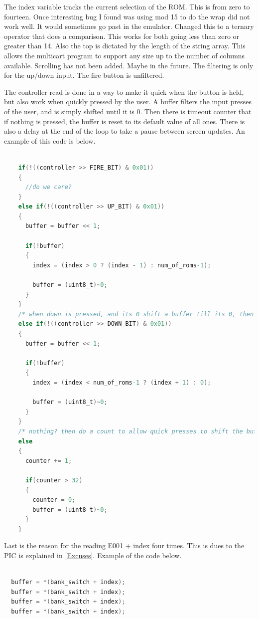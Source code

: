 \documentclass{article}
\begin{document}
  \par
  The index variable tracks the current selection of the ROM. This is from zero to fourteen. Once interesting bug I found was using mod 15 to do the wrap did
  not work well. It would sometimes go past in the emulator. Changed this to a ternary operator that does a comparison. This works for both going
  less than zero or greater than 14. Also the top is dictated by the length of the string array. This allows the multicart program to support any size up to
  the number of columns available. Scrolling has not been added. Maybe in the future. The filtering is only for the up/down input. The fire button is
  unfiltered.
  \par
  The controller read is done in a way to make it quick when the button is held, but also work when quickly pressed by the user. A buffer filters the input
  presses of the user, and is simply shifted until it is 0. Then there is timeout counter that if nothing is pressed, the buffer is reset to its default value
  of all ones. There is also a delay at the end of the loop to take a pause between screen updates. An example of this code is below.

  \begin{lstlisting}[language=C]

    if(!((controller >> FIRE_BIT) & 0x01))
    {
      //do we care?
    }
    else if(!((controller >> UP_BIT) & 0x01))
    {
      buffer = buffer << 1;

      if(!buffer)
      {
        index = (index > 0 ? (index - 1) : num_of_roms-1);

        buffer = (uint8_t)~0;
      }
    }
    /* when down is pressed, and its 0 shift a buffer till its 0, then increment index to move the highlight down the screen */
    else if(!((controller >> DOWN_BIT) & 0x01))
    {
      buffer = buffer << 1;

      if(!buffer)
      {
        index = (index < num_of_roms-1 ? (index + 1) : 0);

        buffer = (uint8_t)~0;
      }
    }
    /* nothing? then do a count to allow quick presses to shift the buffer, and if its been to long, clear everything out */
    else
    {
      counter += 1;

      if(counter > 32)
      {
        counter = 0;
        buffer = (uint8_t)~0;
      }
    }

  \end{lstlisting}

  \par
  Last is the reason for the reading E001 + index four times. This is dues to the PIC is explained in \ref{Excuses}. Example of the code below.

  \begin{lstlisting}[language=C]

  buffer = *(bank_switch + index);
  buffer = *(bank_switch + index);
  buffer = *(bank_switch + index);
  buffer = *(bank_switch + index);
  \end{lstlisting}
\end{document}
